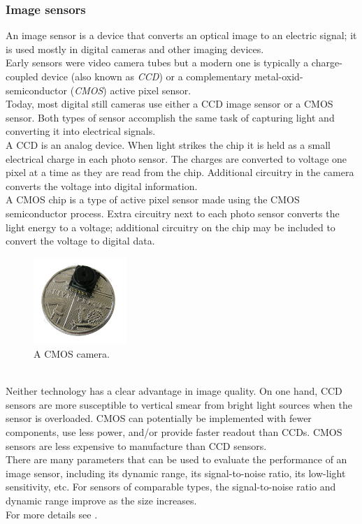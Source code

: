 \subsubsection{Image sensors}
\label{sec:mobile:image}

An image sensor is a device that converts an optical image to an electric
signal; it is used mostly in digital cameras and other imaging devices.
\\
Early sensors were video camera tubes but a modern one is typically a
charge-coupled device (also known as \textit{CCD}) or a complementary
metal-oxid-semiconductor (\textit{CMOS}) active pixel sensor.
\\
Today, most digital still cameras use either a CCD image sensor or a
CMOS sensor. Both types of sensor accomplish the same task of capturing
light and converting it into electrical signals.
\\
A CCD is an analog device. When light strikes the chip it is held as a small
electrical charge in each photo sensor. The charges are converted to voltage
one pixel at a time as they are read from the chip. Additional circuitry in
the camera converts the voltage into digital information.
\\
A CMOS chip is a type of active pixel sensor made using the CMOS semiconductor
process. Extra circuitry next to each photo sensor converts the light
energy to a voltage; additional circuitry on the chip may be included
to convert the voltage to digital data.
\begin{figure} [h]
  \begin{center}
    \includegraphics[width=100pt]{img/cmos_camera.jpg}
    \caption{A CMOS camera.}
    \label{fig:cmos_camera}
  \end{center}
\end{figure}
\\
Neither technology has a clear advantage in image quality. On one hand,
CCD sensors are more susceptible to vertical smear from bright light sources
when the sensor is overloaded.
CMOS can potentially be implemented with fewer components, use less power,
and/or provide faster readout than CCDs.
CMOS sensors are less expensive to manufacture than CCD sensors.
\\
There are many parameters that can be used to evaluate the performance
of an image sensor, including its dynamic range, its signal-to-noise ratio,
its low-light sensitivity, etc. For sensors of comparable types,
the signal-to-noise ratio and dynamic range improve as the size increases.
\\
For more details see \cite{wiki:image_sensor}.

